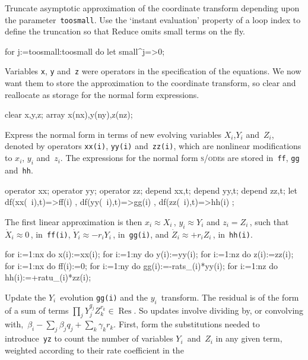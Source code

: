 \documentclass[11pt,a5paper]{article}
\newcommand{\res}{\operatorname{Res}}
\def\sde{\textsc{s/ode}}
\begin{document}
Truncate asymptotic approximation of the coordinate transform depending upon the parameter~\verb|toosmall|.
Use the `instant evaluation' property of a loop index to define the truncation so that Reduce omits small terms on the fly.
\begin{reduce}
for j:=toosmall:toosmall do let small^j=>0;
\end{reduce}

Variables \verb|x|, \verb|y| and~\verb|z| were operators in the specification of the equations.
We now want them to store the approximation to the coordinate transform, so clear and reallocate as storage for the normal form expressions.
\begin{reduce}
clear x,y,z;
array x(nx),y(ny),z(nz);
\end{reduce}

Express the normal form in terms of new evolving variables $X_i$,$Y_i$ and~$Z_i$, denoted by operators \verb|xx(i)|, \verb|yy(i)| and~\verb|zz(i)|, which are nonlinear modifications to $x_i$, $y_i$ and~$z_i$.
The expressions for the normal form \sde{}s are stored in~\verb|ff|, \verb|gg| and~\verb|hh|.
\begin{reduce}
operator xx; operator yy; operator zz;
depend xx,t; depend yy,t; depend zz,t;
let { df(xx(~i),t)=>ff(i) 
    , df(yy(~i),t)=>gg(i) 
    , df(zz(~i),t)=>hh(i) };
\end{reduce}

The first linear approximation is then $x_i\approx X_i$\,, $y_i\approx Y_i$ and $z_i=Z_i$\,, such that $\dot X_i\approx 0$\,, in~\verb|ff(i)|, $\dot Y_i\approx -r_iY_i$\,, in~\verb|gg(i)|, and  $\dot Z_i\approx +r_iZ_i$\,, in~\verb|hh(i)|.
\begin{reduce}
for i:=1:nx do x(i):=xx(i);
for i:=1:ny do y(i):=yy(i);
for i:=1:nz do z(i):=zz(i);
for i:=1:nx do ff(i):=0;
for i:=1:ny do gg(i):=-rats_(i)*yy(i);
for i:=1:nz do hh(i):=+ratu_(i)*zz(i);
\end{reduce}

Update the $Y_i$~evolution \verb|gg(i)| and the $y_i$~transform.
The residual is of the form of a sum of terms $\prod_{j}Y_j^{q_j}Z_k^{r_k} \in\res$.
So updates involve dividing by, or convolving with,~$\beta_i-\sum_j\beta_jq_j+\sum_k\gamma_kr_k$.
First, form the substitutions needed to introduce~\verb|yz| to count the number of variables $Y_i$~and~$Z_i$ in any given term, weighted according to their rate coefficient in the 
\end{document}
